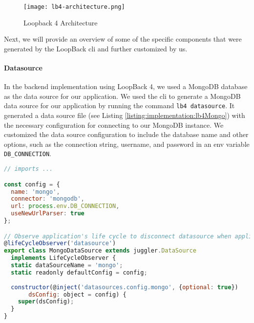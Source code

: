 \begin{figure}[ht]
    \centering
    \texttt{[image: lb4-architecture.png]}
    \caption[Loopback Architecture]{Loopback 4 Architecture}
    \label{implementation:fig:loopbackarchitecture}
\end{figure}

Next, we will provide an overview of some of the specific components that were generated by the LoopBack \ac{cli} and further customized by us.
\paragraph{Datasource}
In the backend implementation using LoopBack 4, we used a MongoDB database as the data source for our application.
We used the \ac{cli} to generate a MongoDB data source for our application by running the command \texttt{lb4 datasource}. 
It generated a data source file (see Listing \ref{listing:implementation:lb4Mongo}) with the necessary configuration for connecting to our MongoDB instance.
We customized the data source configuration to include the database name and other options, such as the connection string, username, and password in an env variable \texttt{DB\_CONNECTION}.

\begin{lstlisting}[language=JavaScript, caption=The Typescript File for the MongoDB Datasource, label=listing:implementation:lb4Mongo]
// imports ...

const config = {
  name: 'mongo',
  connector: 'mongodb',
  url: process.env.DB_CONNECTION,
  useNewUrlParser: true
};

// Observe application's life cycle to disconnect datasource when application is stopped
@lifeCycleObserver('datasource')
export class MongoDataSource extends juggler.DataSource
  implements LifeCycleObserver {
  static dataSourceName = 'mongo';
  static readonly defaultConfig = config;
    
  constructor(@inject('datasources.config.mongo', {optional: true})
       dsConfig: object = config) {
    super(dsConfig);
  }
}
\end{lstlisting}


